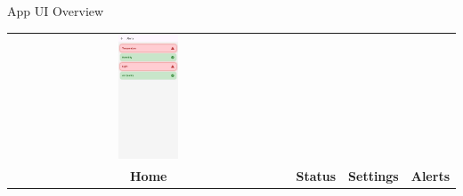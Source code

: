 \documentclass[aspectratio=169]{beamer}
\begin{document}
\begin{frame}{App UI Overview}
\begin{tabular}{cccc}
    \includegraphics[width=0.22\textwidth]{app6.jpeg}\\
    \textbf{Home} & \textbf{Status} & \textbf{Settings} &\textbf{Alerts}\\
\end{tabular}
\end{frame}
\end{document}

